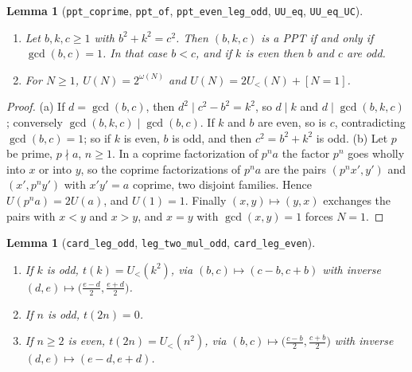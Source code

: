 \documentclass[11pt]{amsart}
\theoremstyle{plain}
\newtheorem{lemma}[theorem]{Lemma}
\theoremstyle{definition}
\newcommand{\code}[1]{\texttt{#1}}
\begin{document}
\begin{lemma}[\code{ppt\_coprime}, \code{ppt\_of}, \code{ppt\_even\_leg\_odd}, \code{UU\_eq}, \code{UU\_eq\_UC}]\label{lem:ppt}
\leavevmode
\begin{enumerate}
\item[(a)] Let $b,k,c\ge1$ with $b^2+k^2=c^2$. Then $(b,k,c)$ is a PPT if and only if $\gcd(b,c)=1$. In that case $b<c$, and if $k$ is even then $b$ and $c$ are odd.
\item[(b)] For $N\ge1$, $U(N)=2^{\omega(N)}$ and $U(N)=2U_<(N)+[N=1]$.
\end{enumerate}
\end{lemma}

\begin{proof}
(a) If $d=\gcd(b,c)$, then $d^2\mid c^2-b^2=k^2$, so $d\mid k$ and $d\mid\gcd(b,k,c)$; conversely $\gcd(b,k,c)\mid\gcd(b,c)$. If $k$ and $b$ are even, so is $c$, contradicting $\gcd(b,c)=1$; so if $k$ is even, $b$ is odd, and then $c^2=b^2+k^2$ is odd. (b) Let $p$ be prime, $p\nmid a$, $n\ge1$. In a coprime factorization of $p^na$ the factor $p^n$ goes wholly into $x$ or into $y$, so the coprime factorizations of $p^na$ are the pairs $(p^nx',y')$ and $(x',p^ny')$ with $x'y'=a$ coprime, two disjoint families. Hence $U(p^na)=2U(a)$, and $U(1)=1$. Finally $(x,y)\mapsto(y,x)$ exchanges the pairs with $x<y$ and $x>y$, and $x=y$ with $\gcd(x,y)=1$ forces $N=1$.
\end{proof}

\begin{lemma}[\code{card\_leg\_odd}, \code{leg\_two\_mul\_odd}, \code{card\_leg\_even}]\label{lem:legs}
\leavevmode
\begin{enumerate}
\item[(a)] If $k$ is odd, $t(k)=U_<(k^2)$, via $(b,c)\mapsto(c-b,c+b)$ with inverse $(d,e)\mapsto\bigl(\tfrac{e-d}2,\tfrac{e+d}2\bigr)$.
\item[(b)] If $n$ is odd, $t(2n)=0$.
\item[(c)] If $n\ge2$ is even, $t(2n)=U_<(n^2)$, via $(b,c)\mapsto\bigl(\tfrac{c-b}2,\tfrac{c+b}2\bigr)$ with inverse $(d,e)\mapsto{}$\linebreak[2]${(e-d,e+d)}$.
\end{enumerate}
\end{lemma}
\end{document}
